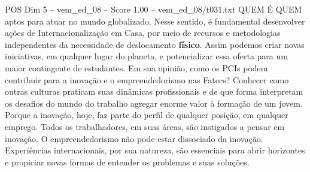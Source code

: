 \begin{textsample}{POS Dim 5 – vem\_ed\_08 – Score 1.00 – vem\_ed\_08/t031.txt}  \label{ex:f5_pos_147}
QUEM É QUEM aptos para atuar no mundo globalizado.
Nesse sentido, é fundamental desenvolver ações de Internacionalização em Casa, por meio de recursos e metodologias independentes da necessidade de deslocamento \textbf{físico}.
Assim podemos criar novas iniciativas, em qualquer lugar do planeta, e potencializar essa oferta para um maior contingente de estudantes.
Em sua opinião, como os PCIs podem contribuir para a inovação e o empreendedorismo nas Fatecs?
Conhecer como outras culturas praticam suas dinâmicas profissionais e de que forma interpretam os desafios do mundo do trabalho agregar enorme valor à formação de um jovem.
Porque a inovação, hoje, faz parte do perfil de qualquer posição, em qualquer emprego.
Todos os trabalhadores, em suas áreas, são instigados a pensar em inovação.
O empreendedorismo não pode estar dissociado da inovação.
Experiências internacionais, por sua natureza, são essenciais para abrir horizontes e propiciar novas formas de entender os problemas e suas soluções.

\end{textsample}
